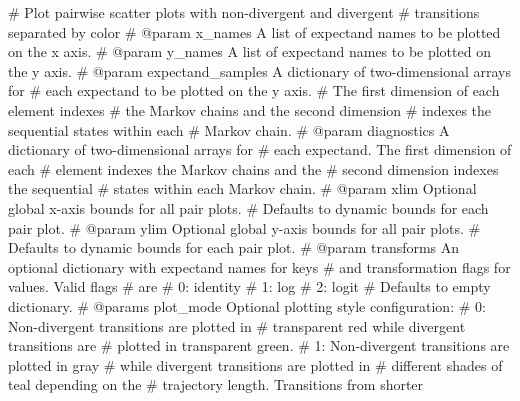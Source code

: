 \documentclass[
  letterpaper,
  DIV=11,
  numbers=noendperiod]{scrartcl}
\newenvironment{Shaded}{\begin{snugshade}}{\end{snugshade}}
\newcommand{\CommentTok}[1]{\textcolor[rgb]{0.37,0.37,0.37}{#1}}
\begin{document}
\begin{Shaded}
\begin{Highlighting}[]
\CommentTok{\# Plot pairwise scatter plots with non{-}divergent and divergent}
\CommentTok{\# transitions separated by color}
\CommentTok{\# @param x\_names A list of expectand names to be plotted on the x axis.}
\CommentTok{\# @param y\_names A list of expectand names to be plotted on the y axis.}
\CommentTok{\# @param expectand\_samples A dictionary of two{-}dimensional arrays for}
\CommentTok{\#                          each expectand to be plotted on the y axis.}
\CommentTok{\#                          The first dimension of each element indexes}
\CommentTok{\#                          the Markov chains and the second dimension}
\CommentTok{\#                          indexes the sequential states within each}
\CommentTok{\#                          Markov chain.}
\CommentTok{\# @param diagnostics A dictionary of two{-}dimensional arrays for}
\CommentTok{\#                    each expectand.  The first dimension of each}
\CommentTok{\#                    element indexes the Markov chains and the}
\CommentTok{\#                    second dimension indexes the sequential}
\CommentTok{\#                    states within each Markov chain.}
\CommentTok{\# @param xlim       Optional global x{-}axis bounds for all pair plots.}
\CommentTok{\#                   Defaults to dynamic bounds for each pair plot.}
\CommentTok{\# @param ylim       Optional global y{-}axis bounds for all pair plots.}
\CommentTok{\#                   Defaults to dynamic bounds for each pair plot.}
\CommentTok{\# @param transforms An optional dictionary with expectand names for keys}
\CommentTok{\#                   and transformation flags for values.  Valid flags}
\CommentTok{\#                   are}
\CommentTok{\#                     0: identity}
\CommentTok{\#                     1: log}
\CommentTok{\#                     2: logit}
\CommentTok{\#                   Defaults to empty dictionary.}
\CommentTok{\# @params plot\_mode Optional plotting style configuration:}
\CommentTok{\#                     0: Non{-}divergent transitions are plotted in}
\CommentTok{\#                        transparent red while divergent transitions are}
\CommentTok{\#                        plotted in transparent green.}
\CommentTok{\#                     1: Non{-}divergent transitions are plotted in gray}
\CommentTok{\#                        while divergent transitions are plotted in}
\CommentTok{\#                        different shades of teal depending on the}
\CommentTok{\#                        trajectory length.  Transitions from shorter}

\end{Highlighting}
\end{Shaded}
\end{document}
